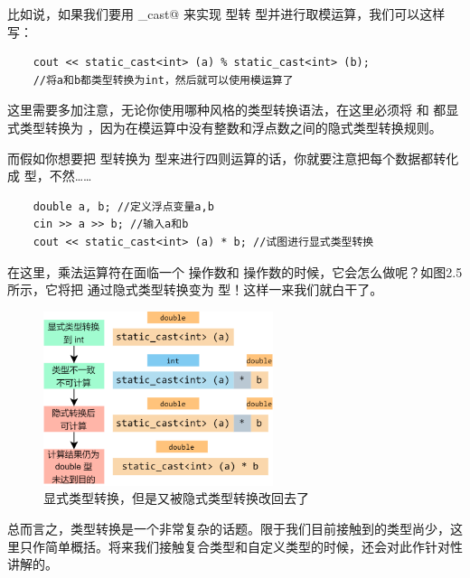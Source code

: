 比如说，如果我们要用 \lstinline@static_cast@ 来实现 \lstinline@double@ 型转 \lstinline@int@ 型并进行取模运算，我们可以这样写：
\begin{lstlisting}
    cout << static_cast<int> (a) % static_cast<int> (b);
    //将a和b都类型转换为int，然后就可以使用模运算了
\end{lstlisting}
这里需要多加注意，无论你使用哪种风格的类型转换语法，在这里必须将 \lstinline@a@ 和 \lstinline@b@ 都显式类型转换为 \lstinline@int@，因为在模运算中没有整数和浮点数之间的隐式类型转换规则。\par
而假如你想要把 \lstinline@double@ 型转换为 \lstinline@int@ 型来进行四则运算的话，你就要注意把每个数据都转化成 \lstinline@int@ 型，不然……
\begin{lstlisting}
    double a, b; //定义浮点变量a,b
    cin >> a >> b; //输入a和b
    cout << static_cast<int> (a) * b; //试图进行显式类型转换
\end{lstlisting}
在这里，乘法运算符在面临一个 \lstinline@int@ 操作数和 \lstinline@double@ 操作数的时候，它会怎么做呢？如图2.5所示，它将把 \lstinline@int@ 通过隐式类型转换变为 \lstinline@double@ 型！这样一来我们就白干了。\par
\begin{figure}[htbp]
    \centering
    \includegraphics[width=0.6\textwidth]{../images/generalized_parts/02_Explicit_type_cast_from_double_to_int_in_vain.png}
    \caption{显式类型转换，但是又被隐式类型转换改回去了}
\end{figure}
总而言之，类型转换是一个非常复杂的话题。限于我们目前接触到的类型尚少，这里只作简单概括。将来我们接触复合类型和自定义类型的时候，还会对此作针对性讲解的。\par

